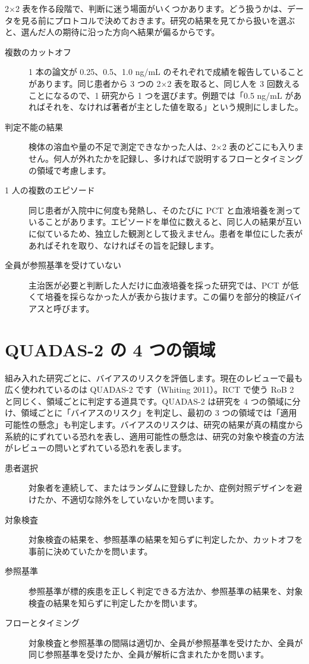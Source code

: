 2×2 表を作る段階で、判断に迷う場面がいくつかあります。どう扱うかは、データを見る前にプロトコルで決めておきます。研究の結果を見てから扱いを選ぶと、選んだ人の期待に沿った方向へ結果が偏るからです。
\begin{description}
\item[複数のカットオフ] 1 本の論文が 0.25、0.5、1.0 ng/mL のそれぞれで成績を報告していることがあります。同じ患者から 3 つの 2×2 表を取ると、同じ人を 3 回数えることになるので、1 研究から 1 つを選びます。例題では「0.5 ng/mL があればそれを、なければ著者が主とした値を取る」という規則にしました。
\item[判定不能の結果] 検体の溶血や量の不足で測定できなかった人は、2×2 表のどこにも入りません。何人が外れたかを記録し、多ければで説明するフローとタイミングの領域で考慮します。
\item[1 人の複数のエピソード] 同じ患者が入院中に何度も発熱し、そのたびに PCT と血液培養を測っていることがあります。エピソードを単位に数えると、同じ人の結果が互いに似ているため、独立した観測として扱えません。患者を単位にした表があればそれを取り、なければその旨を記録します。
\item[全員が参照基準を受けていない] 主治医が必要と判断した人だけに血液培養を採った研究では、PCT が低くて培養を採らなかった人が表から抜けます。この偏りを部分的検証バイアスと呼びます。
\end{description}

\section{QUADAS-2 の 4 つの領域}
\label{sec:12-4}

組み入れた研究ごとに、バイアスのリスクを評価します。現在のレビューで最も広く使われているのは QUADAS-2 です（Whiting 2011）。RCT で使う RoB 2 と同じく、領域ごとに判定する道具です。QUADAS-2 は研究を 4 つの領域に分け、領域ごとに「バイアスのリスク」を判定し、最初の 3 つの領域では「適用可能性の懸念」も判定します。バイアスのリスクは、研究の結果が真の精度から系統的にずれている恐れを表し、適用可能性の懸念は、研究の対象や検査の方法がレビューの問いとずれている恐れを表します。
\begin{description}
\item[患者選択] 対象者を連続して、またはランダムに登録したか、症例対照デザインを避けたか、不適切な除外をしていないかを問います。
\item[対象検査] 対象検査の結果を、参照基準の結果を知らずに判定したか、カットオフを事前に決めていたかを問います。
\item[参照基準] 参照基準が標的疾患を正しく判定できる方法か、参照基準の結果を、対象検査の結果を知らずに判定したかを問います。
\item[フローとタイミング] 対象検査と参照基準の間隔は適切か、全員が参照基準を受けたか、全員が同じ参照基準を受けたか、全員が解析に含まれたかを問います。
\end{description}

